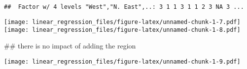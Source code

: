 \documentclass[]{article}
\newenvironment{Shaded}{\begin{snugshade}}{\end{snugshade}}
\newcommand{\KeywordTok}[1]{\textcolor[rgb]{0.13,0.29,0.53}{\textbf{#1}}}
\newcommand{\DataTypeTok}[1]{\textcolor[rgb]{0.13,0.29,0.53}{#1}}
\newcommand{\StringTok}[1]{\textcolor[rgb]{0.31,0.60,0.02}{#1}}
\newcommand{\OperatorTok}[1]{\textcolor[rgb]{0.81,0.36,0.00}{\textbf{#1}}}
\newcommand{\NormalTok}[1]{#1}
\begin{document}
\begin{verbatim}
##  Factor w/ 4 levels "West","N. East",..: 3 1 1 3 1 1 2 3 NA 3 ...
\end{verbatim}

\begin{Shaded}
\end{Shaded}

\texttt{[image: linear\_regression\_files/figure-latex/unnamed-chunk-1-7.pdf]}
\texttt{[image: linear\_regression\_files/figure-latex/unnamed-chunk-1-8.pdf]}

\begin{Shaded}
\begin{Highlighting}[]
\NormalTok{##  there is no impact of adding the region }
\end{Highlighting}
\end{Shaded}

\texttt{[image: linear\_regression\_files/figure-latex/unnamed-chunk-1-9.pdf]}
\end{document}
